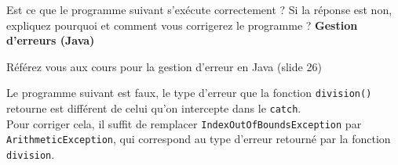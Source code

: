 \begin{Exercice}[5 minutes] Est ce que le programme suivant s'exécute correctement ? Si la réponse est non, expliquez pourquoi et comment vous corrigerez le programme ? \textbf{Gestion d'erreurs (Java)}\\
    

    
     \begin{conseil}
        Référez vous aux cours pour la gestion d'erreur en Java (slide 26)         
     \end{conseil}
     \begin{solution}
     Le programme suivant est faux, le type d'erreur que la fonction \lstinline{division()} retourne est différent de celui qu'on intercepte dans le \lstinline{catch}. \\
     Pour corriger cela, il suffit de remplacer \lstinline{IndexOutOfBoundsException} par \lstinline{ArithmeticException}, qui correspond au type d'erreur retourné par la fonction \lstinline{division}.
     \end{solution}   
 \end{Exercice}



